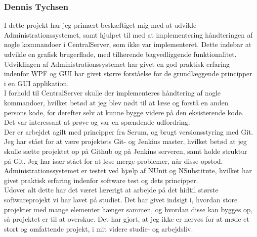\subsubsection{Dennis Tychsen}
I dette projekt har jeg primært beskæftiget mig med at udvikle Administrationssystemet, samt hjulpet til med at implementering håndteringen af nogle kommandoer i CentralServer, som ikke var implementeret. Dette indebar at udvikle en grafisk brugerflade, med tilhørende bagvedliggende funktionalitet. Udviklingen af Administrationssystemet har givet en god praktisk erfaring indenfor WPF og GUI har givet større forståelse for de grundlæggende principper i en GUI applikation.\\
I forhold til CentralServer skulle der implementeres håndtering af nogle kommandoer, hvilket betød at jeg blev nødt til at læse og forstå en anden persons kode, for derefter selv at kunne bygge videre på den eksisterende kode. Det var interessant at prøve og var en spændende udfordring.\\

Der er arbejdet agilt med principper fra Scrum, og brugt versionsstyring med Git. Jeg har stået for at være projektets Git- og Jenkins master, hvilket betød at jeg skulle sætte projektet op på Github og på Jenkins serveren, samt holde struktur på Git. Jeg har især stået for at løse merge-problemer, når disse opstod.\\
Administrationssystemet er testet ved hjælp af NUnit og NSubstitute, hvilket har givet praktisk erfaring indenfor software test og dets principper.\\

Udover alt dette har det været lærerigt at arbejde på det hidtil største softwareprojekt vi har lavet på studiet. Det har givet indsigt i, hvordan store projekter med mange elementer hænger sammen, og hvordan disse kan bygges op, så projektet er til at overskue. Det har gjort, at jeg ikke er nervøs for at møde et stort og omfattende projekt, i mit videre studie- og arbejdsliv.